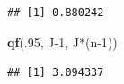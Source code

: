 \documentclass[]{book}
\newenvironment{Shaded}{\begin{snugshade}}{\end{snugshade}}
\newcommand{\KeywordTok}[1]{\textcolor[rgb]{0.13,0.29,0.53}{\textbf{{#1}}}}
\newcommand{\DecValTok}[1]{\textcolor[rgb]{0.00,0.00,0.81}{{#1}}}
\newcommand{\NormalTok}[1]{{#1}}
\begin{document}
\begin{verbatim}
## [1] 0.880242
\end{verbatim}

\begin{Shaded}
\begin{Highlighting}[]
\KeywordTok{qf}\NormalTok{(.}\DecValTok{95}\NormalTok{, J}\DecValTok{-1}\NormalTok{, J*(n}\DecValTok{-1}\NormalTok{))}
\end{Highlighting}
\end{Shaded}

\begin{verbatim}
## [1] 3.094337
\end{verbatim}


\end{document}
